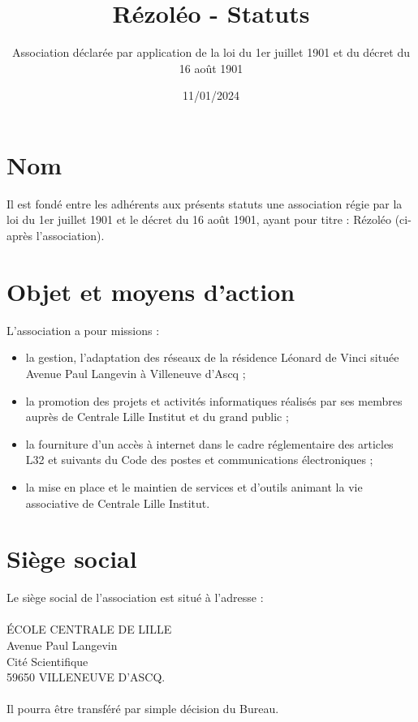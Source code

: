 \documentclass[12pt]{constitution}
\begin{document}
	\title{Rézoléo - Statuts}
	\author{Association déclarée par application de la loi du 1er juillet 1901 et du décret du 16 août 1901}
	\date{11/01/2024}
	\maketitle
	\newpage


	\section{Nom}
Il est fondé entre les adhérents aux présents statuts une association régie par la loi du 1er juillet 1901 et le décret du 16 août 1901, ayant pour titre : Rézoléo (ci-après \og l'association\fg).

	\section{Objet et moyens d'action}
	L'association a pour missions :
	\begin{itemize}
		\item[\textbullet] la gestion, l'adaptation des réseaux de la résidence Léonard de Vinci située Avenue Paul Langevin à Villeneuve d'Ascq ;
		\item[\textbullet]la promotion des projets et activités informatiques réalisés par ses membres auprès de Centrale Lille Institut et du grand public ;
		\item[\textbullet] la fourniture d'un accès à internet dans le cadre réglementaire des articles L32 et suivants du Code des postes et communications électroniques ;
		\item[\textbullet] la mise en place et le maintien de services et d'outils animant la vie associative de Centrale Lille Institut.
	\end{itemize}

	\section{Siège social}
	Le siège social de l'association est situé à l'adresse :\\
	\\
	\noindent ÉCOLE CENTRALE DE LILLE\\
	Avenue Paul Langevin\\
	Cité Scientifique\\
	59650 VILLENEUVE D'ASCQ.\\
	\\
	Il pourra être transféré par simple décision du Bureau.
\end{document}
